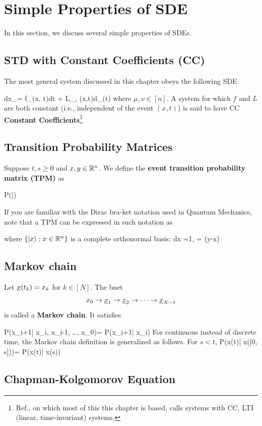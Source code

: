 \section{Simple Properties of SDE}
In this section,
we discuss several simple properties
of SDEs.

\subsection{STD with Constant Coefficients (CC)}
The most general system discussed in this 
chapter obeys the following SDE 

\beq
dx_\mu =
f_\mu(x, t)dt + L_{\mu, \nu}(x,t)d\rvB_\nu(t)
\eeq
where $\mu, \nu\in [n]$.
A system for which $f$ and $L$ are
both constant (i.e., independent of the event $(x,t)$) is said to have CC {\bf Constant Coefficients}\footnote{Ref.\cite{sar-sol},
on which most of this this chapter is
based, calls systems with CC, LTI (linear, time-invariant) systems.}


\subsection {Transition Probability Matrices}

Suppose  $t,s\geq 0$ and $x, y\in { \mathbb{R}}^n$.
We define 
the {\bf event transition probability matrix (TPM)} as

\beq
P(|)
\eeq

If you are familiar with the Dirac bra-ket
notation used in Quantum Mechanics,
note that a TPM can be expressed in such notation as 

\beq {}\eeq
where $\{|x\rangle: x\in{ \mathbb{R}}^n\}$ is a
complete orthonormal basis:
\beq
\int dx\;
=1,\quad 
{} = \delta(y-x)
\eeq

\subsection{Markov chain}

Let $\rvx(t_k)=x_k$ for $k\in[N]$. The bnet 
$$
x_0\rarrow\rvx_1\rarrow \rvx_2\rarrow\cdots\rarrow\rvx_{N-1}$$
is called a {\bf Markov chain}. It satisfies

\beq
P(x_{i+1}| x_i, x_{i-1}, \ldots, x_0)=
P(x_{i+1}| x_i)
\eeq
For continuous instead of discrete time,
the Markov chain definition is generalized
as follows.
For $s<t$, 
\beq
P(x(t)| x([0, s]))=
P(x(t)| x(s))
\eeq
\subsection{Chapman-Kolgomorov Equation}

